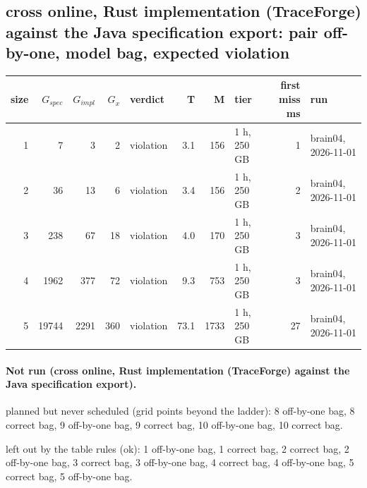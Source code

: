 \documentclass[10pt]{article}
\begin{document}
\subsection*{cross online, Rust implementation (TraceForge) against the Java specification export: pair \textsf{off-by-one}, model bag, expected violation}
\begin{longtable}{@{}rrrrlrrlrl@{}}
\toprule
size & $G_{\mathit{spec}}$ & $G_{\mathit{impl}}$ & $G_x$ & verdict & T & M & tier & first miss ms & run \\
\midrule
\endhead
\color{red} 1 & 7 & 3 & 2 & violation & 3.1 & 156 & 1 h, 250 GB & 1 & brain04, 2026-11-01 \\
\color{red} 2 & 36 & 13 & 6 & violation & 3.4 & 156 & 1 h, 250 GB & 2 & brain04, 2026-11-01 \\
\color{red} 3 & 238 & 67 & 18 & violation & 4.0 & 170 & 1 h, 250 GB & 3 & brain04, 2026-11-01 \\
\color{red} 4 & 1962 & 377 & 72 & violation & 9.3 & 753 & 1 h, 250 GB & 3 & brain04, 2026-11-01 \\
\color{red} 5 & 19744 & 2291 & 360 & violation & 73.1 & 1733 & 1 h, 250 GB & 27 & brain04, 2026-11-01 \\
\bottomrule
\end{longtable}
\paragraph{Not run (cross online, Rust implementation (TraceForge) against the Java specification export).}
planned but never scheduled (grid points beyond the ladder): 8 off-by-one bag, 8 correct bag, 9 off-by-one bag, 9 correct bag, 10 off-by-one bag, 10 correct bag.\par
left out by the table rules (ok): 1 off-by-one bag, 1 correct bag, 2 correct bag, 2 off-by-one bag, 3 correct bag, 3 off-by-one bag, 4 correct bag, 4 off-by-one bag, 5 correct bag, 5 off-by-one bag.\par
\end{document}
